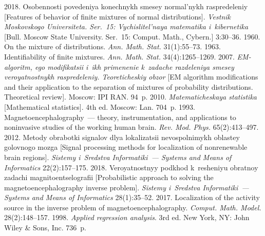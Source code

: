 \begin{multicols}{2}
{{\begin{thebibliography}{99}
 2018. Oso\-ben\-nosti povedeniya konechnykh smesey normal'nykh raspredeleniy 
 [Features of behavior of finite mixtures of normal distributions].  
 \textit{Vestnik Moskovskogo Universiteta. Ser.~15: Vychislitel'naya matematika i~kibernetika} 
 [Bull. Moscow State University. Ser.~15: Comput. Math., Cybern.] 3:30--36.
 1960. On the mixture of distributions.
 \textit{Ann. Math. Stat.} 31(1):55--73.
 1963. Identifiability of finite mixtures. 
 \textit{Ann. Math. Stat.} 34(4):1265--1269.
 2007.  \textit{EM-algoritm, ego modifikatsii i~ikh primenenie 
k~zadache razdeleniya smesey veroyatnostnykh raspredeleniy. Teoreticheskiy obzor} 
[EM algorithm modifications and their application to the separation of mixtures of probability 
distributions. Theoretical review]. Moscow: IPI RAN. 94~p.
 2010.  \textit{Matematicheskaya statistika} [Mathematical statistics]. 4th ed. Moscow: Lan. 704~p.
 1993. Magnetoencephalography~--- theory, instrumentation, and applications to noninvasive studies 
 of the working human brain.  \textit{Rev. Mod. Phys.} 65(2):413--497. 
 2012. Metody obrabotki signalov dlya lokalizatsii nevospolnimykh oblastey golovnogo mozga 
 [Signal processing methods for localization of nonrenewable brain regions]. 
  \textit{Sistemy i~Sredstva Informatiki~--- Systems and Means of Informatics} 22(2):157--175.
 2018. Ve\-ro\-yat\-nost\-nyy podkhod k~resheniyu obratnoy za\-da\-chi mag\-ni\-to\-en\-tse\-lo\-gra\-fii 
 [Probabilistic approach to solving the magnetoencephalography inverse problem].
  \textit{Sistemy i~Sredstva Informatiki~--- Systems and Means of Informatics} 28(1):35--52.
 2017. Localization of the activity source in the inverse problem of magnetoencephalography. 
  \textit{Comput. Math. Model.} 28(2):148--157.
 1998. 
 \textit{Applied regression analysis}. 3rd ed. New York, NY: John Wiley \& Sons, Inc. 736~p.
 \end{thebibliography}

 }
 }

\end{multicols}

